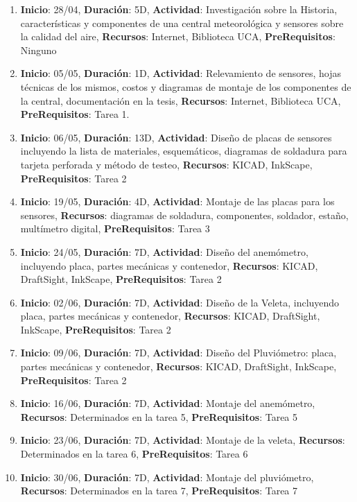 \documentclass[a4paper,11pt, spanish]{article}
\begin{document}
\begin{enumerate}
\item \textbf{Inicio}: 28/04, \textbf{Duración}: 5D, \textbf{Actividad}: Investigación sobre la Historia, características y componentes de una central meteorológica y sensores sobre la calidad del aire, \textbf{Recursos}: Internet, Biblioteca UCA, \textbf{PreRequisitos}: Ninguno
\item \textbf{Inicio}: 05/05, \textbf{Duración}: 1D, \textbf{Actividad}: Relevamiento de sensores, hojas técnicas de los mismos, costos y diagramas de montaje de los componentes de la central, documentación en la tesis, \textbf{Recursos}: Internet, Biblioteca UCA, \textbf{PreRequisitos}: Tarea 1.
\item \textbf{Inicio}: 06/05, \textbf{Duración}: 13D, \textbf{Actividad}: Diseño de placas de sensores incluyendo la lista de materiales, esquemáticos, diagramas de soldadura para tarjeta perforada y método de testeo, \textbf{Recursos}: KICAD, InkScape, \textbf{PreRequisitos}: Tarea 2
\item \textbf{Inicio}: 19/05, \textbf{Duración}: 4D, \textbf{Actividad}: Montaje de las placas para los sensores, \textbf{Recursos}: diagramas de soldadura, componentes, soldador, estaño, multímetro digital, \textbf{PreRequisitos}: Tarea 3
\item \textbf{Inicio}: 24/05, \textbf{Duración}: 7D, \textbf{Actividad}: Diseño del anemómetro, incluyendo placa, partes mecánicas y contenedor, \textbf{Recursos}: KICAD, DraftSight, InkScape, \textbf{PreRequisitos}: Tarea 2
\item \textbf{Inicio}: 02/06, \textbf{Duración}: 7D, \textbf{Actividad}: Diseño de la Veleta, incluyendo placa, partes mecánicas y contenedor, \textbf{Recursos}: KICAD, DraftSight, InkScape, \textbf{PreRequisitos}: Tarea 2
\item \textbf{Inicio}: 09/06, \textbf{Duración}: 7D, \textbf{Actividad}: Diseño del Pluviómetro: placa, partes mecánicas y contenedor, \textbf{Recursos}: KICAD, DraftSight, InkScape, \textbf{PreRequisitos}: Tarea 2
\item \textbf{Inicio}: 16/06, \textbf{Duración}: 7D, \textbf{Actividad}: Montaje del anemómetro, \textbf{Recursos}: Determinados en la tarea 5, \textbf{PreRequisitos}: Tarea 5
\item \textbf{Inicio}: 23/06, \textbf{Duración}: 7D, \textbf{Actividad}: Montaje de la veleta, \textbf{Recursos}: Determinados en la tarea 6, \textbf{PreRequisitos}: Tarea 6
\item \textbf{Inicio}: 30/06, \textbf{Duración}: 7D, \textbf{Actividad}: Montaje del pluviómetro, \textbf{Recursos}: Determinados en la tarea 7, \textbf{PreRequisitos}: Tarea 7

\end{enumerate}
\end{document}
